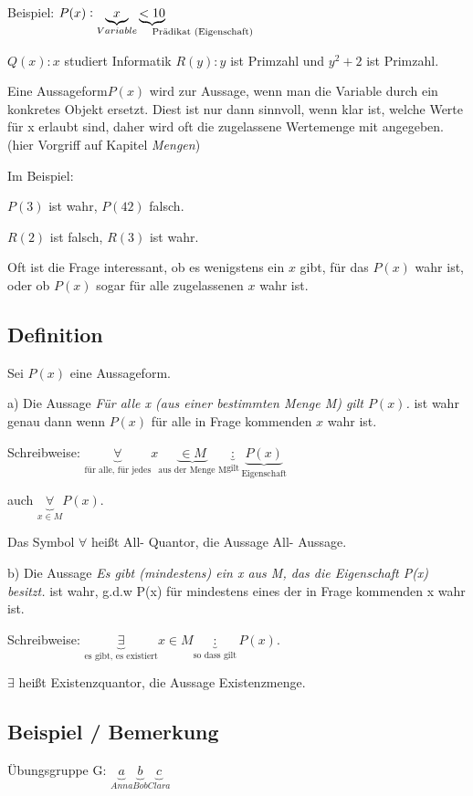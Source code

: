 \documentclass[a4paper, 12pt, twoside] {article}
\begin{document}
Beispiel:
$P(x): \underbrace{x}_{Variable} \underbrace{< 10}_{\mathrlap{\text{Prädikat (Eigenschaft)}}}$

$Q(x): x$ studiert Informatik
$R(y): y$ ist Primzahl und $y^2+2$ ist Primzahl.

Eine Aussageform$P(x)$ wird zur Aussage, wenn man die Variable durch ein konkretes Objekt ersetzt. Diest ist nur dann sinnvoll, wenn klar ist, welche Werte für x erlaubt sind, daher wird oft die zugelassene Wertemenge mit angegeben. (hier Vorgriff auf Kapitel \textit{Mengen})

Im Beispiel:

$P(3)$ ist wahr, $P(42)$ falsch.

$R(2)$ ist falsch, $R(3)$ ist wahr.

Oft ist die Frage interessant, ob es wenigstens ein $x$ gibt, für das $P(x)$ wahr ist, oder ob $P(x)$ sogar für alle zugelassenen $x$ wahr ist.

\subsection{Definition}
Sei $P(x)$ eine Aussageform.

a) Die Aussage \textit{Für alle x (aus einer bestimmten Menge M) gilt $P(x)$.} ist wahr genau dann wenn $P(x)$ für alle in Frage kommenden $x$ wahr ist.

Schreibweise: $\underbrace{\forall}_{\text{für alle, für jedes}} x \underbrace{\in M}_{\text{aus der Menge M}} \underbrace{:}_{\text{gilt}} \underbrace{P(x)}_{\text{Eigenschaft}}$

auch $\underbrace{\forall}_{x \in M} P(x)$.

Das Symbol $\forall$ heißt All- Quantor, die Aussage All- Aussage.

b) Die Aussage \textit{Es gibt (mindestens) ein x aus M, das die Eigenschaft P(x) besitzt.} ist wahr, g.d.w P(x) für mindestens eines der in Frage kommenden x wahr ist.

Schreibweise: $\underbrace{\exists}_{\text{es gibt, es existiert}} x \in M \underbrace{:}_{\text{so dass gilt}} P(x)$.

$\exists$ heißt Existenzquantor, die Aussage Existenzmenge.

\subsection{Beispiel / Bemerkung}
Übungsgruppe G:
$\underbrace{a}_{Anna} \underbrace{b}_{Bob} \underbrace{c}_{Clara}$
\end{document}
